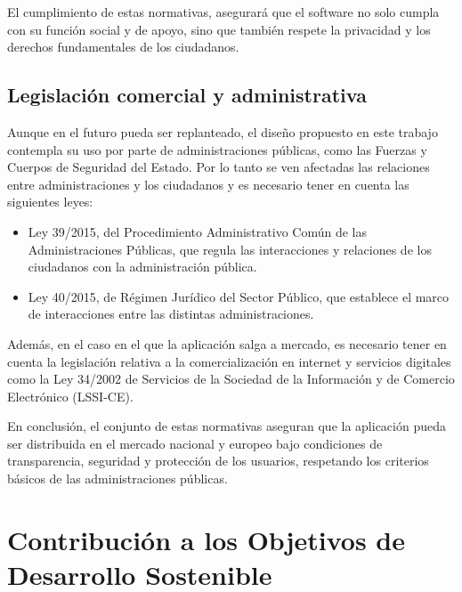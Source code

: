     El cumplimiento de estas normativas, asegurará que el software no solo cumpla con su función social y de apoyo, sino que también respete la privacidad y los derechos fundamentales de los ciudadanos.

    
    \subsection{Legislación comercial y administrativa}
    Aunque en el futuro pueda ser replanteado, el diseño propuesto en este trabajo contempla su uso por parte de administraciones públicas, como las Fuerzas y Cuerpos de Seguridad del Estado. Por lo tanto se ven afectadas las relaciones entre administraciones y los ciudadanos y es necesario tener en cuenta las siguientes leyes:
    \begin{itemize}
        \item Ley 39/2015, del Procedimiento Administrativo Común de las Administraciones Públicas\cite{ley_39_2015}, que regula las interacciones y relaciones de los ciudadanos con la administración pública. 
        \item Ley 40/2015, de Régimen Jurídico del Sector Público\cite{ley_40_2015}, que establece el marco de interacciones entre las distintas administraciones. 
    \end{itemize}

    Además, en el caso en el que la aplicación salga a mercado, es necesario tener en cuenta la legislación relativa a la comercialización en internet y servicios digitales como la Ley 34/2002 de Servicios de la Sociedad de la Información y de Comercio Electrónico (LSSI-CE)\cite{ley_34_2002}. 

    En conclusión, el conjunto de estas normativas aseguran que la aplicación pueda ser distribuida en el mercado nacional y europeo bajo condiciones de transparencia, seguridad y protección de los usuarios, respetando los criterios básicos de las administraciones públicas.

    

    \section{Contribución a los Objetivos de Desarrollo Sostenible}
    
